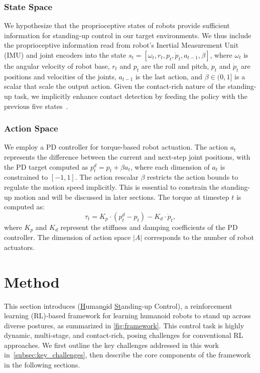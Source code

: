 \subsubsection{State Space} We hypothesize that the proprioceptive states of robots provide sufficient information for standing-up control in our target environments.
We thus include the proprioceptive information read from robot's Inertial Measurement Unit (IMU) and joint encoders into the state $s_t=[\omega_t, r_t,p_t, \dot{p}_t, a_{t-1}, \beta]$, where $\omega_t$ is the angular velocity of robot base,  $r_t$ and $p_t$ are the roll and pitch, $p_t$ and $\dot{p}_t$ are positions and velocities of the joints, $a_{t-1}$ is the last action, and $\beta\in (0, 1]$ is a scalar that scale the output action. 
Given the contact-rich nature of the standing-up task, we implicitly enhance contact detection by feeding the policy with the previous five states~\cite{hwangbo2019learning}. 

\subsubsection{Action Space} We employ a PD controller for torque-based robot actuation. The action $a_t$ represents the difference between the current and next-step joint positions, with the PD target computed as $p_t^d = p_t + \beta a_t$, where each dimension of $a_t$ is constrained to $[-1, 1]$. The action rescalar $\beta$ restricts the action bounds to regulate the motion speed implicitly. This is essential to constrain the standing-up motion and will be discussed in later sections. The torque at timestep $t$ is computed as:
\begin{equation}\label{eq:pd}
    \tau_t = K_p\cdot(p_t^d - p_t) - K_d\cdot \dot{p}_t,
\end{equation}
where $K_p$ and $K_d$ represent the stiffness and damping coefficients of the PD controller. The dimension of action space $|A|$ corresponds to the number of robot actuators.

\section{Method}
This section introduces \ours (\underline{H}uman\underline{o}id \underline{St}anding-up Control), a reinforcement learning (RL)-based framework for learning humanoid robots to stand up across diverse postures, as summarized in \cref{fig:framework}. This control task is highly dynamic, multi-stage, and contact-rich, posing challenges for conventional RL approaches. We first outline the key challenges addressed in this work in~\cref{subsec:key_challenges}, then describe the core components of the framework in the following sections.

